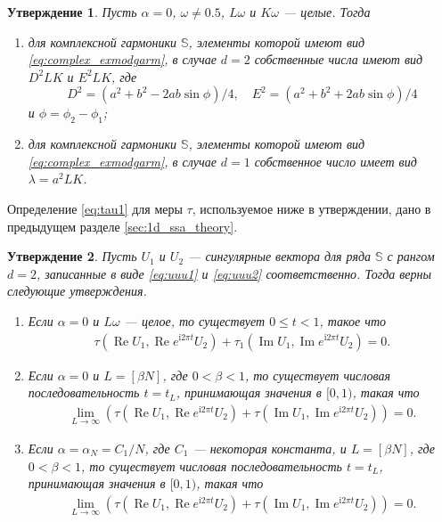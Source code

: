 \documentclass[specialist,
               substylefile = spbu.rtx,
               subf,href,colorlinks=true, 12pt]{disser}
\def\RE{\mathop{\mathrm{Re}}}
\def\IM{\mathop{\mathrm{Im}}}
\newcommand{\I}{\mathrm{i}}
\newtheorem{Th}{Утверждение}
\begin{document}
\begin{Th} \cite[Предложение 2.3]{Golyandina.etal2003} \label{th:cssa_num}
Пусть $\alpha = 0$, $\omega \not = 0.5$, $L\omega$ и $K\omega$ --- целые. Тогда
\begin{enumerate}
\item для комплексной гармоники $\mathbb{S}$, элементы которой имеют вид \eqref{eq:complex_exmodgarm}, в случае $d=2$ собственные числа имеют вид  $D^2LK$ и $E^2LK$, где
\begin{equation*}
D^2=(a^2+b^2-2ab\sin\phi)/4, \quad E^2=(a^2+b^2+2ab\sin\phi)/4
\end{equation*}
и $\phi=\phi_2-\phi_1$;
\item для комплексной гармоники $\mathbb{S}$, элементы которой имеют вид \eqref{eq:complex_exmodgarm}, в случае $d=1$ собственное число имеет вид $\lambda=a^2LK$.
\end{enumerate}
\end{Th}

Определение \eqref{eq:tau1} для меры $\tau$, используемое ниже в утверждении, дано в предыдущем разделе \ref{sec:1d_ssa_theory}.
\begin{Th}   \cite[Теорема 2]{Zhornikova2016} \label{th:th_tau_cssa}
Пусть $U_1$ и $U_2$ --- сингулярные вектора для ряда $\mathbb{S}$ с рангом $d=2$, записанные в виде \eqref{eq:uuu1} и \eqref{eq:uuu2} соответственно. Тогда верны следующие утверждения.
\begin{enumerate}
\item \label{th:complex_t_1}
Если $\alpha=0$ и $L\omega$ --- целое, то существует $0 \leqslant t < 1$, такое что
\begin{gather*}
\tau(\RE U_1, \RE e^{\I 2\pi t} U_2) + \tau_1 (\IM U_1, \IM e^{\I 2\pi t} U_2) = 0.
\end{gather*}
\item \label{th:complex_t_4}
Если $\alpha = 0$ и $L=[\beta N]$, где $0<\beta<1$, то существует числовая последовательность $t = t_L$, принимающая значения в $[0,1)$, такая что
\begin{gather*}
\lim_{L \rightarrow \infty} (\tau (\RE U_1, \RE e^{\I 2\pi t} U_2) + \tau (\IM U_1, \IM e^{\I 2\pi t} U_2)) = 0.
\end{gather*}
\item \label{th:complex_t_5}
Если $\alpha = \alpha_N = C_1/N$, где $C_1$ --- некоторая константа, и $L=[\beta N]$, где $0<\beta<1$, то существует числовая последовательность $t = t_L$, принимающая значения в $[0,1)$, такая что
\begin{gather*}
\lim_{L \rightarrow \infty} (\tau (\RE U_1, \RE e^{\I 2\pi t} U_2) + \tau (\IM U_1, \IM e^{\I 2\pi t} U_2)) = 0.
\end{gather*}
\end{enumerate}
\end{Th}
\end{document}
